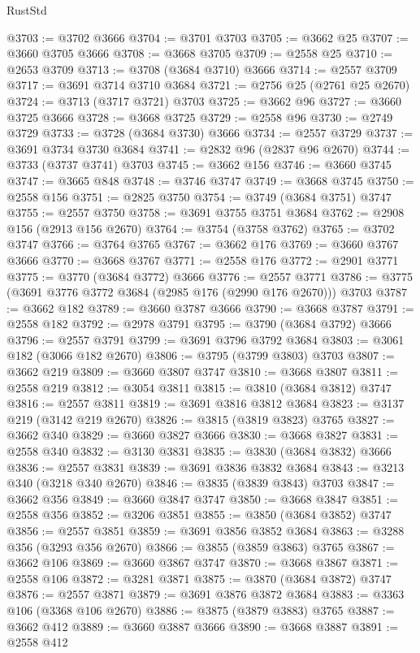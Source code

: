 \begin{lexlean}{RustStd}
\begin{coremodule}
@3703 := @3702 @3666
@3704 := @3701 @3703
@3705 := @3662 @25
@3707 := @3660 @3705 @3666
@3708 := @3668 @3705
@3709 := @2558 @25
@3710 := @2653 @3709
@3713 := @3708 (@3684 @3710) @3666
@3714 := @2557 @3709
@3717 := @3691 @3714 @3710 @3684
@3721 := @2756 @25 (@2761 @25 @2670)
@3724 := @3713 (@3717 @3721) @3703
@3725 := @3662 @96
@3727 := @3660 @3725 @3666
@3728 := @3668 @3725
@3729 := @2558 @96
@3730 := @2749 @3729
@3733 := @3728 (@3684 @3730) @3666
@3734 := @2557 @3729
@3737 := @3691 @3734 @3730 @3684
@3741 := @2832 @96 (@2837 @96 @2670)
@3744 := @3733 (@3737 @3741) @3703
@3745 := @3662 @156
@3746 := @3660 @3745
@3747 := @3665 @848
@3748 := @3746 @3747
@3749 := @3668 @3745
@3750 := @2558 @156
@3751 := @2825 @3750
@3754 := @3749 (@3684 @3751) @3747
@3755 := @2557 @3750
@3758 := @3691 @3755 @3751 @3684
@3762 := @2908 @156 (@2913 @156 @2670)
@3764 := @3754 (@3758 @3762)
@3765 := @3702 @3747
@3766 := @3764 @3765
@3767 := @3662 @176
@3769 := @3660 @3767 @3666
@3770 := @3668 @3767
@3771 := @2558 @176
@3772 := @2901 @3771
@3775 := @3770 (@3684 @3772) @3666
@3776 := @2557 @3771
@3786 := @3775 (@3691 @3776 @3772 @3684 (@2985 @176 (@2990 @176 @2670))) @3703
@3787 := @3662 @182
@3789 := @3660 @3787 @3666
@3790 := @3668 @3787
@3791 := @2558 @182
@3792 := @2978 @3791
@3795 := @3790 (@3684 @3792) @3666
@3796 := @2557 @3791
@3799 := @3691 @3796 @3792 @3684
@3803 := @3061 @182 (@3066 @182 @2670)
@3806 := @3795 (@3799 @3803) @3703
@3807 := @3662 @219
@3809 := @3660 @3807 @3747
@3810 := @3668 @3807
@3811 := @2558 @219
@3812 := @3054 @3811
@3815 := @3810 (@3684 @3812) @3747
@3816 := @2557 @3811
@3819 := @3691 @3816 @3812 @3684
@3823 := @3137 @219 (@3142 @219 @2670)
@3826 := @3815 (@3819 @3823) @3765
@3827 := @3662 @340
@3829 := @3660 @3827 @3666
@3830 := @3668 @3827
@3831 := @2558 @340
@3832 := @3130 @3831
@3835 := @3830 (@3684 @3832) @3666
@3836 := @2557 @3831
@3839 := @3691 @3836 @3832 @3684
@3843 := @3213 @340 (@3218 @340 @2670)
@3846 := @3835 (@3839 @3843) @3703
@3847 := @3662 @356
@3849 := @3660 @3847 @3747
@3850 := @3668 @3847
@3851 := @2558 @356
@3852 := @3206 @3851
@3855 := @3850 (@3684 @3852) @3747
@3856 := @2557 @3851
@3859 := @3691 @3856 @3852 @3684
@3863 := @3288 @356 (@3293 @356 @2670)
@3866 := @3855 (@3859 @3863) @3765
@3867 := @3662 @106
@3869 := @3660 @3867 @3747
@3870 := @3668 @3867
@3871 := @2558 @106
@3872 := @3281 @3871
@3875 := @3870 (@3684 @3872) @3747
@3876 := @2557 @3871
@3879 := @3691 @3876 @3872 @3684
@3883 := @3363 @106 (@3368 @106 @2670)
@3886 := @3875 (@3879 @3883) @3765
@3887 := @3662 @412
@3889 := @3660 @3887 @3666
@3890 := @3668 @3887
@3891 := @2558 @412

\end{coremodule}
\end{lexlean}
